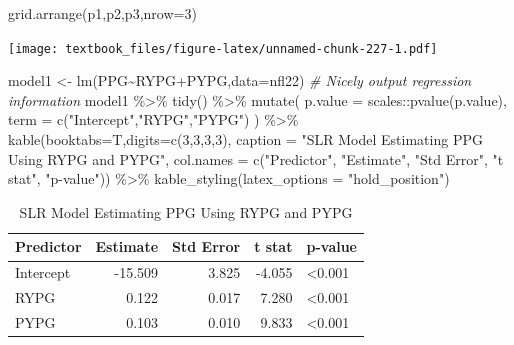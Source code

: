\documentclass[
  11pt,
]{book}
\newenvironment{Shaded}{\begin{snugshade}}{\end{snugshade}}
\newcommand{\AttributeTok}[1]{\textcolor[rgb]{0.77,0.63,0.00}{#1}}
\newcommand{\CommentTok}[1]{\textcolor[rgb]{0.56,0.35,0.01}{\textit{#1}}}
\newcommand{\DecValTok}[1]{\textcolor[rgb]{0.00,0.00,0.81}{#1}}
\newcommand{\FunctionTok}[1]{\textcolor[rgb]{0.00,0.00,0.00}{#1}}
\newcommand{\NormalTok}[1]{#1}
\newcommand{\OtherTok}[1]{\textcolor[rgb]{0.56,0.35,0.01}{#1}}
\newcommand{\SpecialCharTok}[1]{\textcolor[rgb]{0.00,0.00,0.00}{#1}}
\newcommand{\StringTok}[1]{\textcolor[rgb]{0.31,0.60,0.02}{#1}}
\theoremstyle{definition}
\theoremstyle{definition}
\theoremstyle{definition}
\theoremstyle{definition}
\theoremstyle{remark}
\begin{document}
\begin{Shaded}
\begin{Highlighting}[]
\FunctionTok{grid.arrange}\NormalTok{(p1,p2,p3,}\AttributeTok{nrow=}\DecValTok{3}\NormalTok{)}
\end{Highlighting}
\end{Shaded}

\texttt{[image: textbook\_files/figure-latex/unnamed-chunk-227-1.pdf]}

\newpage

\begin{Shaded}
\begin{Highlighting}[]
\NormalTok{model1 }\OtherTok{\textless{}{-}} \FunctionTok{lm}\NormalTok{(PPG}\SpecialCharTok{\textasciitilde{}}\NormalTok{RYPG}\SpecialCharTok{+}\NormalTok{PYPG,}\AttributeTok{data=}\NormalTok{nfl22)}
\CommentTok{\# Nicely output regression information}
\NormalTok{model1 }\SpecialCharTok{\%\textgreater{}\%} \FunctionTok{tidy}\NormalTok{() }\SpecialCharTok{\%\textgreater{}\%}
  \FunctionTok{mutate}\NormalTok{(}
    \AttributeTok{p.value =}\NormalTok{ scales}\SpecialCharTok{::}\FunctionTok{pvalue}\NormalTok{(p.value),}
    \AttributeTok{term =} \FunctionTok{c}\NormalTok{(}\StringTok{"Intercept"}\NormalTok{,}\StringTok{"RYPG"}\NormalTok{,}\StringTok{"PYPG"}\NormalTok{)}
\NormalTok{  ) }\SpecialCharTok{\%\textgreater{}\%}
  \FunctionTok{kable}\NormalTok{(}\AttributeTok{booktabs=}\NormalTok{T,}\AttributeTok{digits=}\FunctionTok{c}\NormalTok{(}\DecValTok{3}\NormalTok{,}\DecValTok{3}\NormalTok{,}\DecValTok{3}\NormalTok{,}\DecValTok{3}\NormalTok{), }
        \AttributeTok{caption =} \StringTok{"SLR Model Estimating PPG Using RYPG and PYPG"}\NormalTok{,}
        \AttributeTok{col.names =} \FunctionTok{c}\NormalTok{(}\StringTok{"Predictor"}\NormalTok{, }\StringTok{"Estimate"}\NormalTok{, }\StringTok{"Std Error"}\NormalTok{, }\StringTok{"t stat"}\NormalTok{, }\StringTok{"p{-}value"}\NormalTok{)) }\SpecialCharTok{\%\textgreater{}\%}
  \FunctionTok{kable\_styling}\NormalTok{(}\AttributeTok{latex\_options =} \StringTok{"hold\_position"}\NormalTok{)}
\end{Highlighting}
\end{Shaded}

\begin{table}[!h]

\caption{\label{tab:unnamed-chunk-228}SLR Model Estimating PPG Using RYPG and PYPG}
\centering
\begin{tabular}[t]{lrrrl}
\toprule
Predictor & Estimate & Std Error & t stat & p-value\\
\midrule
Intercept & -15.509 & 3.825 & -4.055 & <0.001\\
RYPG & 0.122 & 0.017 & 7.280 & <0.001\\
PYPG & 0.103 & 0.010 & 9.833 & <0.001\\
\bottomrule
\end{tabular}
\end{table}
\end{document}
